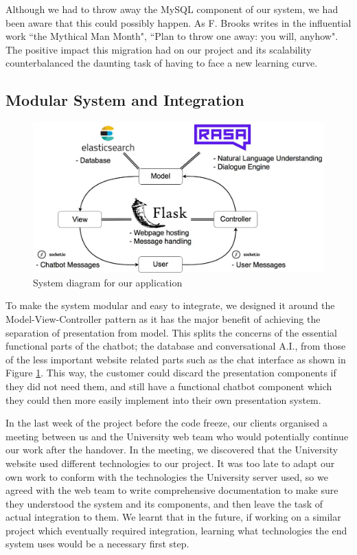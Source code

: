 \documentclass{l3proj}
\begin{document}
Although we had to throw away the MySQL component of our system, we had been aware that this could possibly happen. As F. Brooks writes in the influential work ``the Mythical Man Month",  ``Plan to throw one away: you will, anyhow"\cite{manmonth:Brooks}. The positive impact this migration had on our project and its scalability counterbalanced the daunting task of having to face a new learning curve.

\subsection{Modular System and Integration}

\begin{figure}[h!]
    \centering
    \includegraphics[width=0.75\linewidth]{figures/MVC.jpg}
    \caption{System diagram for our application}
    \label{fig:mvc}
\end{figure}

To make the system modular and easy to integrate, we designed it around the Model-View-Controller pattern as it has the major benefit of achieving the separation of presentation from model\cite{patterns:Fowler}. This splits the concerns of the essential functional parts of the chatbot; the database and conversational A.I., from those of the less important website related parts such as the chat interface as shown in Figure \ref{fig:mvc}. This way, the customer could discard the presentation components if they did not need them, and still have a functional chatbot component which they could then more easily implement into their own presentation system.

In the last week of the project before the code freeze, our clients organised a meeting between us and the University web team who would potentially continue our work after the handover. In the meeting, we discovered that the University website used different technologies to our project. It was too late to adapt our own work to conform with the technologies the University server used, so we agreed with the web team to write comprehensive documentation to make sure they understood the system and its components, and then leave the task of actual integration to them. We learnt that in the future, if working on a similar project which eventually required integration, learning what technologies the end system uses would be a necessary first step.
\end{document}
